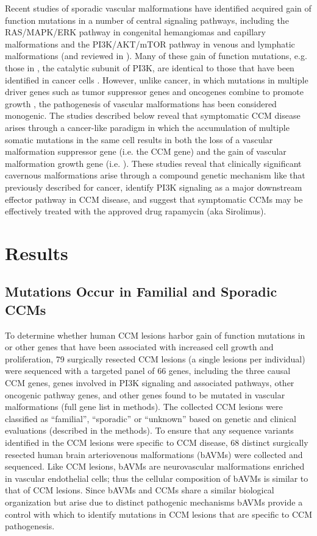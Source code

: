 Recent studies of sporadic vascular malformations have identified acquired gain of function mutations in a number of central signaling pathways, including the RAS/MAPK/ERK pathway in congenital hemangiomas and capillary malformations and the PI3K/AKT/mTOR pathway in venous and lymphatic malformations \citep{tenbroek2019, rodriguezlaguna2019, castillo2019, wetzelstrong2017, luks2015, limaye2015} (and reviewed in \citep{queisser2018}). Many of these gain of function mutations, e.g. those in , the catalytic subunit of PI3K, are identical to those that have been identified in cancer cells \citep{castillo2016, castel2016, limaye2015, koren2015, samuels2005}. However, unlike cancer, in which mutations in multiple driver genes such as tumor suppressor genes and oncogenes combine to promote growth \citep{bailey2018, mcgranahan2015}, the pathogenesis of vascular malformations has been considered monogenic. The studies described below reveal that symptomatic CCM disease arises through a cancer-like paradigm in which the accumulation of multiple somatic mutations in the same cell results in both the loss of a vascular malformation suppressor gene (i.e. the CCM gene) and the gain of vascular malformation growth gene (i.e. ). These studies reveal that clinically significant cavernous malformations arise through a compound genetic mechanism like that previously described for cancer, identify PI3K signaling as a major downstream effector pathway in CCM disease, and suggest that symptomatic CCMs may be effectively treated with the approved drug rapamycin (aka Sirolimus). 

\section{Results}
\subsection{ Mutations Occur in Familial and Sporadic CCMs}
To determine whether human CCM lesions harbor gain of function mutations in  or other genes that have been associated with increased cell growth and proliferation, 79 surgically resected CCM lesions (a single lesions per individual) were sequenced with a targeted panel of 66 genes, including the three causal CCM genes, genes involved in PI3K signaling and associated pathways, other oncogenic pathway genes, and other genes found to be mutated in vascular malformations (full gene list in methods). The collected CCM lesions were classified as “familial”, “sporadic” or “unknown” based on genetic and clinical evaluations (described in the methods). To ensure that any sequence variants identified in the CCM lesions were specific to CCM disease, 68 distinct surgically resected human brain arteriovenous malformations (bAVMs) were collected and sequenced. Like CCM lesions, bAVMs are neurovascular malformations enriched in vascular endothelial cells; thus the cellular composition of bAVMs is similar to that of CCM lesions. Since bAVMs and CCMs share a similar biological organization but arise due to distinct pathogenic mechanisms bAVMs provide a control with which to identify mutations in CCM lesions that are specific to CCM pathogenesis. 

